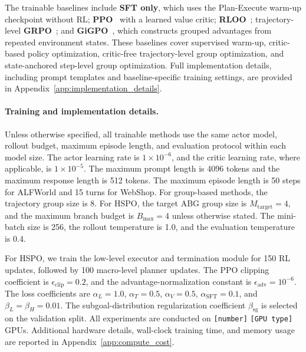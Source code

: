 \documentclass{article}
\begin{document}
The trainable baselines include \textbf{SFT only}, which uses the Plan-Execute warm-up checkpoint without RL; \textbf{PPO}~\cite{schulman2017proximal} with a learned value critic; \textbf{RLOO}~\cite{ahmadian2024back}; trajectory-level \textbf{GRPO}~\cite{shao2024deepseekmath}; and \textbf{GiGPO}~\cite{NEURIPS2025_420c9f77}, which constructs grouped advantages from repeated environment states. These baselines cover supervised warm-up, critic-based policy optimization, critic-free trajectory-level group optimization, and state-anchored step-level group optimization. Full implementation details, including prompt templates and baseline-specific training settings, are provided in Appendix~\ref{app:implementation_details}.

\paragraph{Training and implementation details.}
Unless otherwise specified, all trainable methods use the same actor model, rollout budget, maximum episode length, and evaluation protocol within each model size. The actor learning rate is $1{\times}10^{-6}$, and the critic learning rate, where applicable, is $1{\times}10^{-5}$. The maximum prompt length is 4096 tokens and the maximum response length is 512 tokens. The maximum episode length is 50 steps for ALFWorld and 15 turns for WebShop. For group-based methods, the trajectory group size is 8. For HSPO, the target ABG group size is $M_{\mathrm{target}}=4$, and the maximum branch budget is $B_{\max}=4$ unless otherwise stated. The mini-batch size is 256, the rollout temperature is 1.0, and the evaluation temperature is 0.4.

For HSPO, we train the low-level executor and termination module for 150 RL updates, followed by 100 macro-level planner updates. The PPO clipping coefficient is $\epsilon_{\mathrm{clip}}=0.2$, and the advantage-normalization constant is $\epsilon_{\mathrm{adv}}=10^{-6}$. The loss coefficients are $\alpha_L=1.0$, $\alpha_T=0.5$, $\alpha_V=0.5$, $\alpha_{\mathrm{SFT}}=0.1$, and $\beta_L=\beta_H=0.01$. The subgoal-distribution regularization coefficient $\beta_{\mathrm{sg}}$ is selected on the validation split. All experiments are conducted on \texttt{[number]} \texttt{[GPU type]} GPUs. Additional hardware details, wall-clock training time, and memory usage are reported in Appendix~\ref{app:compute_cost}.
\end{document}
